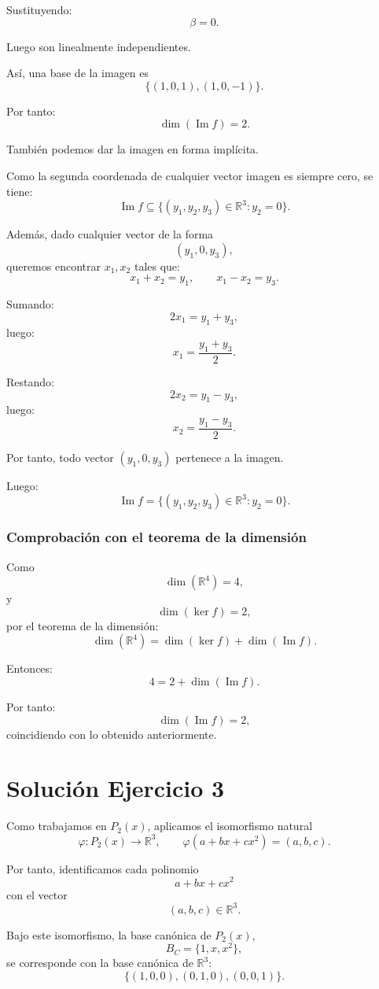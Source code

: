 \documentclass[12pt]{article}
\begin{document}
Sustituyendo:
\[
\beta=0.
\]

Luego son linealmente independientes.

Así, una base de la imagen es
\[
\boxed{\{(1,0,1),(1,0,-1)\}.}
\]

Por tanto:
\[
\boxed{\dim(\operatorname{Im} f)=2.}
\]

También podemos dar la imagen en forma implícita.

Como la segunda coordenada de cualquier vector imagen es siempre cero, se tiene:
\[
\operatorname{Im} f\subseteq \{(y_1,y_2,y_3)\in\mathbb{R}^3:y_2=0\}.
\]

Además, dado cualquier vector de la forma
\[
(y_1,0,y_3),
\]
queremos encontrar \(x_1,x_2\) tales que:
\[
x_1+x_2=y_1,
\qquad
x_1-x_2=y_3.
\]

Sumando:
\[
2x_1=y_1+y_3,
\]
luego:
\[
x_1=\frac{y_1+y_3}{2}.
\]

Restando:
\[
2x_2=y_1-y_3,
\]
luego:
\[
x_2=\frac{y_1-y_3}{2}.
\]

Por tanto, todo vector \((y_1,0,y_3)\) pertenece a la imagen.

Luego:
\[
\boxed{
\operatorname{Im} f=\{(y_1,y_2,y_3)\in\mathbb{R}^3:y_2=0\}.
}
\]

\subsubsection*{Comprobación con el teorema de la dimensión}

Como
\[
\dim(\mathbb{R}^4)=4,
\]
y
\[
\dim(\ker f)=2,
\]
por el teorema de la dimensión:
\[
\dim(\mathbb{R}^4)=\dim(\ker f)+\dim(\operatorname{Im} f).
\]

Entonces:
\[
4=2+\dim(\operatorname{Im} f).
\]

Por tanto:
\[
\dim(\operatorname{Im} f)=2,
\]
coincidiendo con lo obtenido anteriormente.

\section*{Solución Ejercicio 3}

Como trabajamos en \(P_2(x)\), aplicamos el isomorfismo natural
\[
\varphi:P_2(x)\longrightarrow \mathbb{R}^3,
\qquad
\varphi(a+bx+cx^2)=(a,b,c).
\]

Por tanto, identificamos cada polinomio
\[
a+bx+cx^2
\]
con el vector
\[
(a,b,c)\in\mathbb{R}^3.
\]

Bajo este isomorfismo, la base canónica de \(P_2(x)\),
\[
B_C=\{1,x,x^2\},
\]
se corresponde con la base canónica de \(\mathbb{R}^3\):
\[
\{(1,0,0),(0,1,0),(0,0,1)\}.
\]
\end{document}
